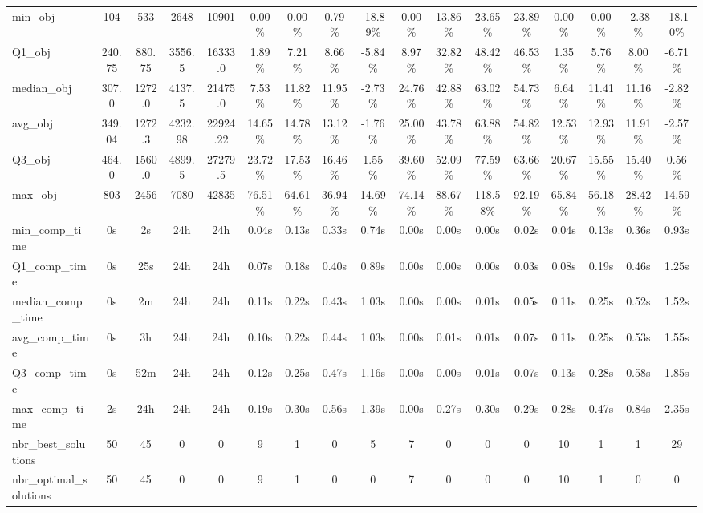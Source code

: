 \begin{tabular}{lcccccccccccccccc}
min_obj & 104 & 533 & 2648 & 10901 & 0.00\% & 0.00\% & 0.79\% & -18.89\% & 0.00\% & 13.86\% & 23.65\% & 23.89\% & 0.00\% & 0.00\% & -2.38\% & -18.10\% \\
Q1_obj & 240.75 & 880.75 & 3556.5 & 16333.0 & 1.89\% & 7.21\% & 8.66\% & -5.84\% & 8.97\% & 32.82\% & 48.42\% & 46.53\% & 1.35\% & 5.76\% & 8.00\% & -6.71\% \\
median_obj & 307.0 & 1272.0 & 4137.5 & 21475.0 & 7.53\% & 11.82\% & 11.95\% & -2.73\% & 24.76\% & 42.88\% & 63.02\% & 54.73\% & 6.64\% & 11.41\% & 11.16\% & -2.82\% \\
avg_obj & 349.04 & 1272.3 & 4232.98 & 22924.22 & 14.65\% & 14.78\% & 13.12\% & -1.76\% & 25.00\% & 43.78\% & 63.88\% & 54.82\% & 12.53\% & 12.93\% & 11.91\% & -2.57\% \\
Q3_obj & 464.0 & 1560.0 & 4899.5 & 27279.5 & 23.72\% & 17.53\% & 16.46\% & 1.55\% & 39.60\% & 52.09\% & 77.59\% & 63.66\% & 20.67\% & 15.55\% & 15.40\% & 0.56\% \\
max_obj & 803 & 2456 & 7080 & 42835 & 76.51\% & 64.61\% & 36.94\% & 14.69\% & 74.14\% & 88.67\% & 118.58\% & 92.19\% & 65.84\% & 56.18\% & 28.42\% & 14.59\% \\
min_comp_time & 0s & 2s & 24h & 24h & 0.04s & 0.13s & 0.33s & 0.74s & 0.00s & 0.00s & 0.00s & 0.02s & 0.04s & 0.13s & 0.36s & 0.93s \\
Q1_comp_time & 0s & 25s & 24h & 24h & 0.07s & 0.18s & 0.40s & 0.89s & 0.00s & 0.00s & 0.00s & 0.03s & 0.08s & 0.19s & 0.46s & 1.25s \\
median_comp_time & 0s & 2m & 24h & 24h & 0.11s & 0.22s & 0.43s & 1.03s & 0.00s & 0.00s & 0.01s & 0.05s & 0.11s & 0.25s & 0.52s & 1.52s \\
avg_comp_time & 0s & 3h & 24h & 24h & 0.10s & 0.22s & 0.44s & 1.03s & 0.00s & 0.01s & 0.01s & 0.07s & 0.11s & 0.25s & 0.53s & 1.55s \\
Q3_comp_time & 0s & 52m & 24h & 24h & 0.12s & 0.25s & 0.47s & 1.16s & 0.00s & 0.00s & 0.01s & 0.07s & 0.13s & 0.28s & 0.58s & 1.85s \\
max_comp_time & 2s & 24h & 24h & 24h & 0.19s & 0.30s & 0.56s & 1.39s & 0.00s & 0.27s & 0.30s & 0.29s & 0.28s & 0.47s & 0.84s & 2.35s \\
nbr_best_solutions & 50 & 45 & 0 & 0 & 9 & 1 & 0 & 5 & 7 & 0 & 0 & 0 & 10 & 1 & 1 & 29 \\
nbr_optimal_solutions & 50 & 45 & 0 & 0 & 9 & 1 & 0 & 0 & 7 & 0 & 0 & 0 & 10 & 1 & 0 & 0 \\
\bottomrule
\end{tabular}

